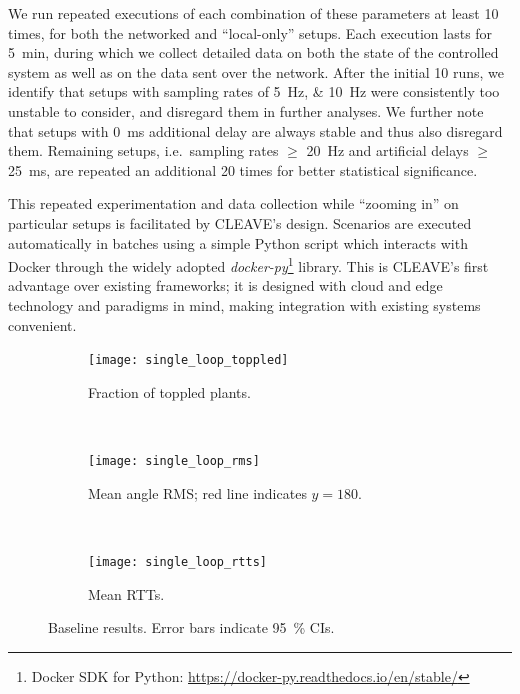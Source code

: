 We run repeated executions of each combination of these parameters at least \num{10} times, for both the networked and ``local-only'' setups.
Each execution lasts for \SI{5}{\minute}, during which we collect detailed data on both the state of the controlled system as well as on the data sent over the network.
After the initial \num{10} runs, we identify that setups with sampling rates of \SIlist{5;10}{\hertz} were consistently too unstable to consider, and disregard them in further analyses.
We further note that setups with \SI{0}{\milli\second} additional delay are always stable and thus also disregard them.
Remaining setups, i.e.\ sampling rates \( \geq \) \SI{20}{\hertz} and artificial delays \( \geq \) \SI{25}{\milli\second}, are repeated an additional \num{20} times for better statistical significance.

This repeated experimentation and data collection while ``zooming in'' on particular setups is facilitated by \ac{CLEAVE}'s design.
Scenarios are executed automatically in batches using a simple Python script which interacts with Docker through the widely adopted \emph{docker-py}\footnote{Docker SDK for Python: \url{https://docker-py.readthedocs.io/en/stable/}} library.
This is \ac{CLEAVE}'s first advantage over existing frameworks; it is designed with cloud and edge technology and paradigms in mind, making integration with existing systems convenient.

\begin{figure}[t]
    \centering
    \begin{subfigure}[t]{\columnwidth}
        \centering
        \texttt{[image: single\_loop\_toppled]}
        \caption{Fraction of toppled plants.}\label{fig:single:topple}
    \end{subfigure}\\
    \begin{subfigure}[t]{\columnwidth}
        \centering
        \texttt{[image: single\_loop\_rms]}
        \caption{Mean angle \acs*{RMS}; red line indicates \( y = 180 \).}\label{fig:single:rms}
    \end{subfigure}\\
    \begin{subfigure}[t]{\columnwidth}
        \centering
        \texttt{[image: single\_loop\_rtts]}
        \caption{
            Mean \acsp*{RTT}.
        }\label{fig:single:rtt}
    \end{subfigure}%
    \caption[caption]{
        Baseline results.
        Error bars indicate \SI{95}{\percent} \acp{CI}.
        }%
    \label{fig:single}
\end{figure}


